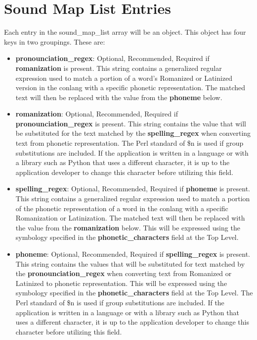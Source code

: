 \chapter{Sound Map List Entries}
Each entry in the sound\_map\_list array will be an object.  This object has four keys in two groupings.  These are:
\begin{itemize}
	\item \textbf{pronounciation\_regex}: Optional, Recommended, Required if \textbf{romanization} is present.  This string contains a generalized regular expression used to match a portion of a word's Romanized or Latinized version in the conlang with a specific phonetic representation.  The matched text will then be replaced with the value from the \textbf{phoneme} below.
	\item \textbf{romanization}: Optional, Recommended, Required if \textbf{pronounciation\_regex} is present.  This string contains the value that will be substituted for the text matched by the \textbf{spelling\_regex} when converting text from phonetic representation.  The Perl standard of \$n is used if group substitutions are included.  If the application is written in a language or with a library such as Python that uses a different character, it is up to the application developer to change this character before utilizing this field.
	\item \textbf{spelling\_regex}: Optional, Recommended, Required if \textbf{phoneme} is present.  This string contains a generalized regular expression used to match a portion of the phonetic representation of a word in the conlang with a specific Romanization or Latinization.  The matched text will then be replaced with the value from the \textbf{romanization} below.  This will be expressed using the symbology specified in the \textbf{phonetic\_characters} field at the Top Level.
	\item \textbf{phoneme}: Optional, Recommended, Required if \textbf{spelling\_regex} is present.  This string contains the values that will be substituted for text matched by the \textbf{pronounciation\_regex} when converting text from Romanized or Latinized to phonetic representation.  This will be expressed using the symbology specified in the \textbf{phonetic\_characters} field at the Top Level.  The Perl standard of \$n is used if group substitutions are included.  If the application is written in a language or with a library such as Python that uses a different character, it is up to the application developer to change this character before utilizing this field.
\end{itemize}

